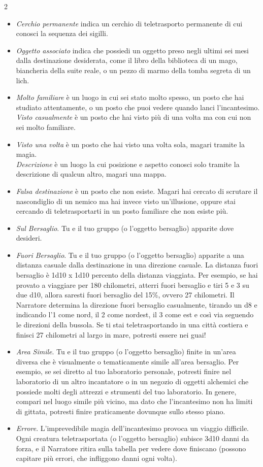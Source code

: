\begin{multicols}{2}
\begin{itemize}[leftmargin=*] \setlength{\itemsep}{0pt}
	\item \emph{Cerchio permanente} indica un cerchio di teletrasporto permanente di cui conosci la sequenza dei sigilli.
	\item \emph{Oggetto associato} indica che possiedi un oggetto preso negli ultimi sei mesi dalla destinazione desiderata, come il libro della biblioteca di un mago, biancheria della suite reale, o un pezzo di marmo della tomba segreta di un lich.
	\item \emph{Molto familiare} è un luogo in cui sei stato molto spesso, un posto che hai studiato attentamente, o un posto che puoi vedere quando lanci l'incantesimo.
	\emph{Visto casualmente} è un posto che hai visto più di una volta ma con cui non sei molto familiare.
	\item \emph{Visto una volta} è un posto che hai visto una volta sola, magari tramite la magia.\\ \emph{Descrizione} è un luogo la cui posizione e aspetto conosci solo tramite la descrizione di qualcun altro, magari una mappa.
	\item \emph{Falsa destinazione} è un posto che non esiste. Magari hai cercato di scrutare il nascondiglio di un nemico ma hai invece visto un'illusione, oppure stai cercando di teletrasportarti in un posto familiare che non esiste più.
	\item \emph{Sul Bersaglio}. Tu e il tuo gruppo (o l'oggetto bersaglio) apparite dove desideri.
	\item \emph{Fuori Bersaglio}. Tu e il tuo gruppo (o l'oggetto bersaglio) apparite a una distanza casuale dalla destinazione in una direzione casuale. La distanza fuori bersaglio è 1d10 x 1d10 percento della distanza viaggiata. Per esempio, se hai provato a viaggiare per 180 chilometri, atterri fuori bersaglio e tiri 5 e 3 su due d10, allora saresti fuori bersaglio del 15\%, ovvero 27 chilometri. Il Narratore determina la direzione fuori bersaglio casualmente, tirando un d8 e indicando l'1 come nord, il 2 come nordest, il 3 come est e così via seguendo le direzioni della bussola. Se ti stai teletrasportando in una città costiera e finisci 27 chilometri al largo in mare, potresti essere nei guai!
	\item \emph{Area Simile}. Tu e il tuo gruppo (o l'oggetto bersaglio) finite in un'area diversa che è visualmente o tematicamente simile all'area bersaglio. Per esempio, se sei diretto al tuo laboratorio personale, potresti finire nel laboratorio di un altro incantatore o in un negozio di oggetti alchemici che possiede molti degli attrezzi e strumenti del tuo laboratorio. In genere, compari nel luogo simile più vicino, ma dato che l'incantesimo non ha limiti di gittata, potresti finire praticamente dovunque sullo stesso piano.
	\item \emph{Errore}. L'imprevedibile magia dell'incantesimo provoca un viaggio difficile. Ogni creatura teletrasportata (o l'oggetto bersaglio) subisce 3d10 danni da forza, e il Narratore ritira sulla tabella per vedere dove finiscano (possono capitare più errori, che infliggono danni ogni volta).
\end{itemize}


\end{multicols}
